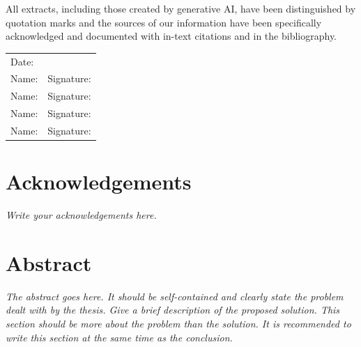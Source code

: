 \documentclass[12pt,oneside]{report}
\begin{document}
All extracts, including those created by generative AI, have been distinguished by quotation marks and the sources of our information have been specifically acknowledged and documented with in-text citations and in the bibliography.

\vspace{2cm}

\begin{tabular}{p{6cm} p{6cm}}
Date: \underline{\hspace{4cm}} & \\[1.5cm]
Name: \underline{\hspace{4cm}} & Signature: \underline{\hspace{4cm}} \\[1cm]
Name: \underline{\hspace{4cm}} & Signature: \underline{\hspace{4cm}} \\[1cm]
Name: \underline{\hspace{4cm}} & Signature: \underline{\hspace{4cm}} \\[1cm]
Name: \underline{\hspace{4cm}} & Signature: \underline{\hspace{4cm}} \\
\end{tabular}

\newpage
\chapter*{Acknowledgements}

\textit{Write your acknowledgements here.}

\newpage
\chapter*{Abstract}

\textit{The abstract goes here. It should be self-contained and clearly state the problem dealt with by the thesis. Give a brief description of the proposed solution. This section should be more about the problem than the solution. It is recommended to write this section at the same time as the conclusion.}

\newpage
\tableofcontents
\newpage









\newpage




\end{document}
